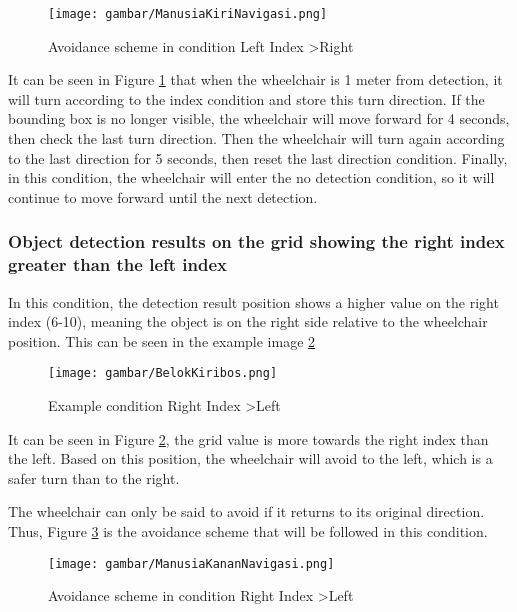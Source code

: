 \begin{figure}[H]
  \centering
  \texttt{[image: gambar/ManusiaKiriNavigasi.png]}
  \caption{Avoidance scheme in condition Left Index \textgreater Right}
  \label{fig:Scheme Condition Left Index > Right}
\end{figure}

It can be seen in Figure \ref{fig:Scheme Condition Left Index > Right} that when the wheelchair is 1 meter from detection, it will turn according to the index condition and store this turn direction. If the bounding box is no longer visible, the wheelchair will move forward for 4 seconds, then check the last turn direction. Then the wheelchair will turn again according to the last direction for 5 seconds, then reset the last direction condition. Finally, in this condition, the wheelchair will enter the no detection condition, so it will continue to move forward until the next detection.

\subsubsection{Object detection results on the grid showing the right index greater than the left index}

In this condition, the detection result position shows a higher value on the right index (6-10), meaning the object is on the right side relative to the wheelchair position. This can be seen in the example image \ref{fig:Condition Right Index > Left}

\begin{figure}[H]
    \centering
    \texttt{[image: gambar/BelokKiribos.png]}
    \caption{Example condition Right Index \textgreater Left}
    \label{fig:Condition Right Index > Left}
\end{figure}

It can be seen in Figure \ref{fig:Condition Right Index > Left}, the grid value is more towards the right index than the left. Based on this position, the wheelchair will avoid to the left, which is a safer turn than to the right.

The wheelchair can only be said to avoid if it returns to its original direction. Thus, Figure \ref{fig:Scheme Condition Right Index > Left} is the avoidance scheme that will be followed in this condition.

\begin{figure}[H]
  \centering
  \texttt{[image: gambar/ManusiaKananNavigasi.png]}
  \caption{Avoidance scheme in condition Right Index \textgreater Left}
  \label{fig:Scheme Condition Right Index > Left}
\end{figure}

